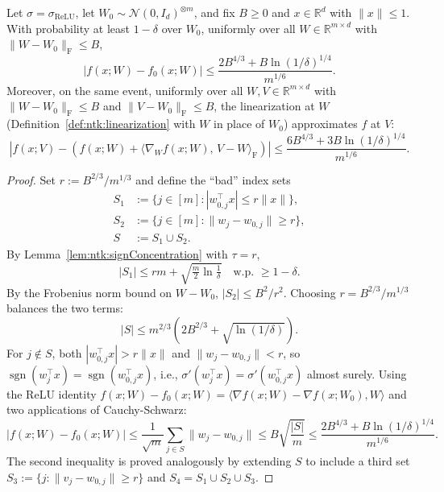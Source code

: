 \begin{lemma}\label{lem:ntk:reluLinearization}
  \leanok
Let $\sigma = \sigma_{\mathrm{ReLU}}$, let $W_0 \sim \mathcal{N}(0,I_d)^{\otimes m}$,
and fix $B \ge 0$ and $x \in \mathbb{R}^d$ with $\|x\| \le 1$.
With probability at least $1 - \delta$ over $W_0$, uniformly over all
$W \in \mathbb{R}^{m \times d}$ with $\|W - W_0\|_{\mathrm{F}} \le B$,
\[
  |f(x; W) - f_0(x; W)| \le \frac{2B^{4/3} + B\ln(1/\delta)^{1/4}}{m^{1/6}}.
\]
Moreover, on the same event, uniformly over all $W, V \in \mathbb{R}^{m \times d}$ with
$\|W - W_0\|_{\mathrm{F}} \le B$ and $\|V - W_0\|_{\mathrm{F}} \le B$, the linearization at $W$
(Definition~\ref{def:ntk:linearization} with $W$ in place of $W_0$) approximates $f$ at $V$:
\[
  |f(x; V) - (f(x; W) + \langle \nabla_W f(x; W),\, V - W\rangle_{\mathrm{F}})| \le
  \frac{6B^{4/3} + 3B\ln(1/\delta)^{1/4}}{m^{1/6}}.
\]
\end{lemma}

\begin{proof}
  \leanok
Set $r := B^{2/3}/m^{1/3}$ and define the ``bad'' index sets
\begin{align*}
  S_1 &:= \bigl\{j \in [m] : |w_{0,j}^\top x| \le r\|x\|\bigr\}, \\
  S_2 &:= \bigl\{j \in [m] : \|w_j - w_{0,j}\| \ge r\bigr\}, \\
  S   &:= S_1 \cup S_2.
\end{align*}
By Lemma~\ref{lem:ntk:signConcentration} with $\tau = r$,
\[
  |S_1| \le rm + \sqrt{\tfrac{m}{2}\ln\tfrac{1}{\delta}} \quad \text{w.p.\ } \ge 1 - \delta.
\]
By the Frobenius norm bound on $W - W_0$, $|S_2| \le B^2/r^2$.
Choosing $r = B^{2/3}/m^{1/3}$ balances the two terms:
\[
  |S| \le m^{2/3}\!\left(2B^{2/3} + \sqrt{\ln(1/\delta)}\right).
\]
For $j \notin S$, both $|w_{0,j}^\top x| > r\|x\|$ and $\|w_j - w_{0,j}\| < r$, so
$\operatorname{sgn}(w_j^\top x) = \operatorname{sgn}(w_{0,j}^\top x)$, i.e.,
$\sigma'(w_j^\top x) = \sigma'(w_{0,j}^\top x)$ almost surely.
Using the ReLU identity $f(x;W) - f_0(x;W) = \langle \nabla f(x;W) - \nabla f(x;W_0), W\rangle$
and two applications of Cauchy-Schwarz:
\[
  |f(x;W) - f_0(x;W)|
  \le \frac{1}{\sqrt{m}} \sum_{j \in S} \|w_j - w_{0,j}\|
  \le B \sqrt{\frac{|S|}{m}}
  \le \frac{2B^{4/3} + B\ln(1/\delta)^{1/4}}{m^{1/6}}.
\]
The second inequality is proved analogously by extending $S$ to include a third set
$S_3 := \{j : \|v_j - w_{0,j}\| \ge r\}$ and $S_4 = S_1 \cup S_2 \cup S_3$.
\end{proof}


